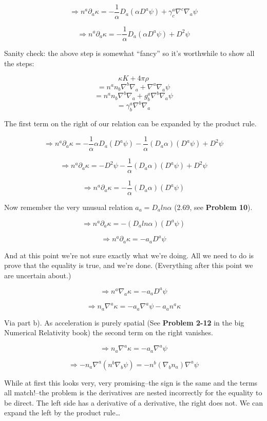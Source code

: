 \documentclass[landscape,letterpaper,10pt,english]{article}
\begin{document}
\[ \Rightarrow n^a \partial_a \kappa = -\frac{1}{\alpha} D_a(\alpha D^a \psi) + \gamma^a_c \nabla^c \nabla_a \psi \]

\[ \Rightarrow n^a \partial_a \kappa = -\frac{1}{\alpha} D_a(\alpha D^a \psi) + D^2 \psi \]

    Sanity check: the above step is somewhat ``fancy'' so it's worthwhile to
show all the steps:

\[ \kappa K + 4 \pi \rho \]
\[ = n^an_b\nabla^b\nabla_a + \nabla^a \nabla_a \psi \]
\[ = n^an_b\nabla^b\nabla_a + g^a_b \nabla^b \nabla_a \psi \]
\[ = \gamma^a_b \nabla^b\nabla_a \]

    The first term on the right of our relation can be expanded by the
product rule.

\[ \Rightarrow n^a \partial_a \kappa = -\frac{1}{\alpha} \alpha D_a( D^a \psi) -\frac{1}{\alpha} (D_a\alpha) (D^a \psi) + D^2 \psi \]

\[ \Rightarrow n^a \partial_a \kappa = - D^2 \psi - \frac{1}{\alpha} (D_a\alpha) (D^a \psi) + D^2 \psi \]

\[ \Rightarrow n^a \partial_a \kappa = - \frac{1}{\alpha} (D_a\alpha) (D^a \psi) \]

Now remember the very unusual relation \(a_a = D_a ln\alpha\) (2.69, see
\textbf{Problem 10}).

\[ \Rightarrow n^a \partial_a \kappa = - (D_a ln\alpha) (D^a \psi) \]

\[ \Rightarrow n^a \partial_a \kappa = - a_a D^a \psi \]

And at this point we're not sure exactly what we're doing. All we need
to do is prove that the equality is true, and we're done. (Everything
after this point we are uncertain about.)

    \[ \Rightarrow n^a \nabla_a \kappa = - a_a D^a \psi \]

\[ \Rightarrow n_a \nabla^a \kappa = - a_a \nabla^a \psi - a_an^a\kappa\]

Via part b). As acceleration is purely spatial (See \textbf{Problem
2-12} in the big Numerical Relativity book) the second term on the right
vanishes.

\[ \Rightarrow n_a \nabla^a \kappa = - a_a \nabla^a \psi\]

\[ \Rightarrow -n_a \nabla^a (n^b\nabla_b \psi) = - n^b (\nabla_b n_a) \nabla^a \psi\]

While at first this looks very, very promising--the sign is the same and
the terms all match!--the problem is the derivatives are nested
incorrectly for the equality to be direct. The left side has a
derivative of a derivative, the right does not. We can expand the left
by the product rule\ldots{}
\end{document}
